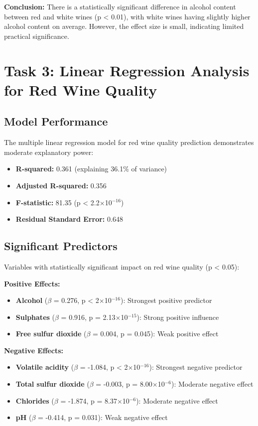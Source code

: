 \textbf{Conclusion:} There is a statistically significant difference in alcohol content between red and white wines (p < 0.01), with white wines having slightly higher alcohol content on average. However, the effect size is small, indicating limited practical significance.

\section{Task 3: Linear Regression Analysis for Red Wine Quality}

\subsection{Model Performance}
The multiple linear regression model for red wine quality prediction demonstrates moderate explanatory power:
\begin{itemize}
\item \textbf{R-squared:} 0.361 (explaining 36.1\% of variance)
\item \textbf{Adjusted R-squared:} 0.356
\item \textbf{F-statistic:} 81.35 (p < 2.2$\times$10$^{-16}$)
\item \textbf{Residual Standard Error:} 0.648
\end{itemize}

\subsection{Significant Predictors}
Variables with statistically significant impact on red wine quality (p < 0.05):

\textbf{Positive Effects:}
\begin{itemize}
\item \textbf{Alcohol} ($\beta$ = 0.276, p < 2$\times$10$^{-16}$): Strongest positive predictor
\item \textbf{Sulphates} ($\beta$ = 0.916, p = 2.13$\times$10$^{-15}$): Strong positive influence
\item \textbf{Free sulfur dioxide} ($\beta$ = 0.004, p = 0.045): Weak positive effect
\end{itemize}

\textbf{Negative Effects:}
\begin{itemize}
\item \textbf{Volatile acidity} ($\beta$ = -1.084, p < 2$\times$10$^{-16}$): Strongest negative predictor
\item \textbf{Total sulfur dioxide} ($\beta$ = -0.003, p = 8.00$\times$10$^{-6}$): Moderate negative effect
\item \textbf{Chlorides} ($\beta$ = -1.874, p = 8.37$\times$10$^{-6}$): Moderate negative effect
\item \textbf{pH} ($\beta$ = -0.414, p = 0.031): Weak negative effect
\end{itemize}

